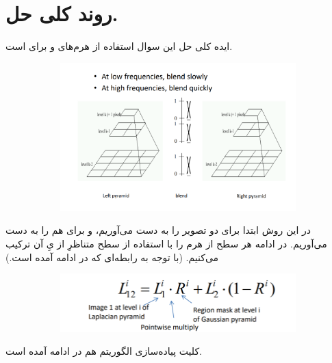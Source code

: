 \documentclass[a4paper,12pt]{article}
\begin{document}
	\section*{روند کلی حل.}
	ایده کلی حل این سوال استفاده از هرم‌های 
	و 
	برای 
	است. 
	\begin{figure}[H]
		\centering
		\begin{subfigure}{0.9\textwidth}
			\centering
			\includegraphics[width=.8\textwidth]{2.png}
		\end{subfigure}
	\end{figure}
	در این روش ابتدا برای دو تصویر 
	را به دست ‌می‌آوریم، و برای 
	هم 
	را به دست می‌آوریم. در ادامه هر سطح از هرم را با استفاده از سطح متناظرِ
	از 
	‌یِ
	آن ترکیب می‌کنیم. (با توجه به رابطه‌ای که در ادامه آمده است.)
	\begin{figure}[H]
		\centering
		\begin{subfigure}{0.9\textwidth}
			\centering
			\includegraphics[width=\textwidth]{1.png}
		\end{subfigure}
	\end{figure}
	کلیت پیاده‌سازی الگوریتم هم در ادامه آمده است.
\end{document}
